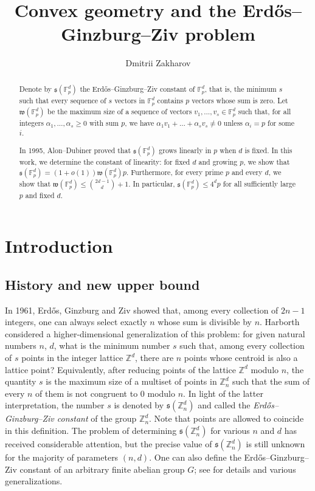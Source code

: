 \documentclass{daj}
\renewcommand{\le}{\leqslant}
\renewcommand{\ge}{\geqslant}
\newcommand{\s}{\mathfrak s}
\newcommand{\Z}{\mathbb Z}
\newcommand{\FF}{\mathbb F}
\theoremstyle{definition}
\theoremstyle{remark}
\theoremstyle{definition}
\theoremstyle{definition}
\begin{document}
\begin{frontmatter}[classification=text]
\title{Convex geometry and the Erd{\H o}s--Ginzburg--Ziv problem}
\author[dz]{Dmitrii Zakharov}
\date{}

\begin{abstract}
Denote by ${\mathfrak s}({\mathbb F}_p^d)$ the Erd{\H o}s--Ginzburg--Ziv constant of $\FF_p^d$, that is, the minimum $s$ such that every sequence of $s$ vectors in ${\mathbb F}_p^d$ contains $p$ vectors whose sum is zero. Let ${\mathfrak w}({\mathbb F}_p^d)$ be the maximum size of a sequence of vectors $v_1, \ldots, v_s \in {\mathbb F}_p^d$ such that, for all integers $\alpha_1, \ldots, \alpha_s \ge 0$ with sum $p$, we have $\alpha_1 v_1 + \ldots + \alpha_s v_s \neq 0$ unless $\alpha_i = p$ for some $i$. 

In 1995, Alon--Dubiner proved that $\s(\FF_p^d)$ grows linearly in $p$ when $d$ is fixed. In this work, we determine the constant of linearity:
for fixed $d$ and growing $p$, we show that ${\mathfrak s}({\mathbb F}_p^d) = (1+o(1)) {\mathfrak w}({\mathbb F}_p^d) p$. Furthermore, for every prime $p$ and every $d$, we show that ${\mathfrak w}({\mathbb F}_p^d) \le {2d-1 \choose d}+1$. In particular,  ${\mathfrak s}({\mathbb F}_p^d) \le 4^d p$ for all sufficiently large $p$ and fixed $d$.
\end{abstract}
\end{frontmatter}

\section{Introduction}\label{sec1}

\subsection{History and new upper bound} 

In 1961, Erd{\H o}s, Ginzburg and Ziv \cite{EGZ} showed that, among every collection of $2n-1$ integers, one can always select exactly $n$ whose sum is divisible by $n$. Harborth \cite{Har} considered a higher-dimensional generalization of this problem: for given natural numbers $n$, $d$, what is the minimum number $s$ such that, among every collection of $s$ points in the integer lattice $\Z^d$, there are $n$ points whose centroid is also a lattice point?
Equivalently, after reducing points of the lattice $\Z^d$ modulo $n$, the quantity $s$ is the maximum size of a multiset of points in $\Z_n^d$ such that the sum of every $n$ of them is not congruent to 0 modulo $n$. In light of the latter interpretation, the number $s$ is denoted by $\s(\Z_n^d)$ and called the {\it Erd{\H o}s--Ginzburg--Ziv constant} of the group $\Z_n^d$. Note that points are allowed to coincide in this definition.
The problem of determining $\s(\Z_n^d)$ for various $n$ and $d$ has received considerable attention, but the precise value of $\s(\Z_n^d)$ is still unknown for the majority of parameters $(n, d)$. One can also define the Erd{\H o}s--Ginzburg--Ziv constant of an arbitrary finite abelian group $G$; see \cite{GG} for details and various generalizations. 
\end{document}
